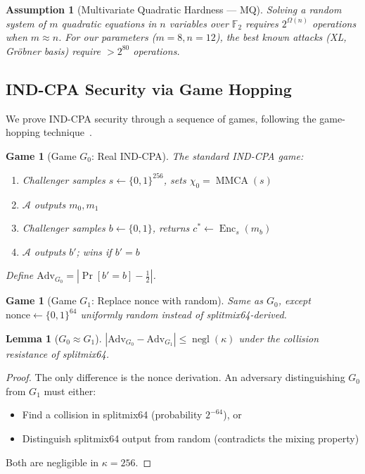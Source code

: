 \documentclass[11pt,a4paper]{article}
\newtheorem{lemma}[theorem]{Lemma}
\newtheorem{assumption}[theorem]{Assumption}
\newtheorem{game}[theorem]{Game}
\DeclareMathOperator{\Enc}{Enc}
\DeclareMathOperator{\negl}{negl}
\DeclareMathOperator{\MMCA}{MMCA}
\begin{document}
\begin{assumption}[Multivariate Quadratic Hardness — MQ]
\label{ass:mq}
Solving a random system of $m$ quadratic equations in $n$ variables over $\mathbb{F}_2$ requires $2^{\Omega(n)}$ operations when $m \approx n$. For our parameters ($m=8, n=12$), the best known attacks (XL, Gröbner basis) require $>2^{80}$ operations.
\end{assumption}

\subsection{IND-CPA Security via Game Hopping}

We prove IND-CPA security through a sequence of games, following the game-hopping technique~\cite{shoup2004}.

\begin{game}[Game $G_0$: Real IND-CPA]
\label{game:g0}
The standard IND-CPA game:
\begin{enumerate}[leftmargin=*,itemsep=1pt]
    \item Challenger samples $s \leftarrow \{0,1\}^{256}$, sets $\chi_0 = \MMCA(s)$
    \item $\mathcal{A}$ outputs $m_0, m_1$
    \item Challenger samples $b \leftarrow \{0,1\}$, returns $c^* \leftarrow \Enc_s(m_b)$
    \item $\mathcal{A}$ outputs $b'$; wins if $b' = b$
\end{enumerate}
Define $\text{Adv}_{G_0} = |\Pr[b'=b] - \frac{1}{2}|$.
\end{game}

\begin{game}[Game $G_1$: Replace nonce with random]
\label{game:g1}
Same as $G_0$, except $\text{nonce} \leftarrow \{0,1\}^{64}$ uniformly random instead of splitmix64-derived.
\end{game}

\begin{lemma}[$G_0 \approx G_1$]
\label{lem:g0g1}
$|\text{Adv}_{G_0} - \text{Adv}_{G_1}| \leq \negl(\kappa)$ under the collision resistance of splitmix64.
\end{lemma}

\begin{proof}
The only difference is the nonce derivation. An adversary distinguishing $G_0$ from $G_1$ must either:
\begin{itemize}[leftmargin=*,itemsep=1pt]
    \item Find a collision in splitmix64 (probability $2^{-64}$), or
    \item Distinguish splitmix64 output from random (contradicts the mixing property)
\end{itemize}
Both are negligible in $\kappa = 256$.
\end{proof}
\end{document}
